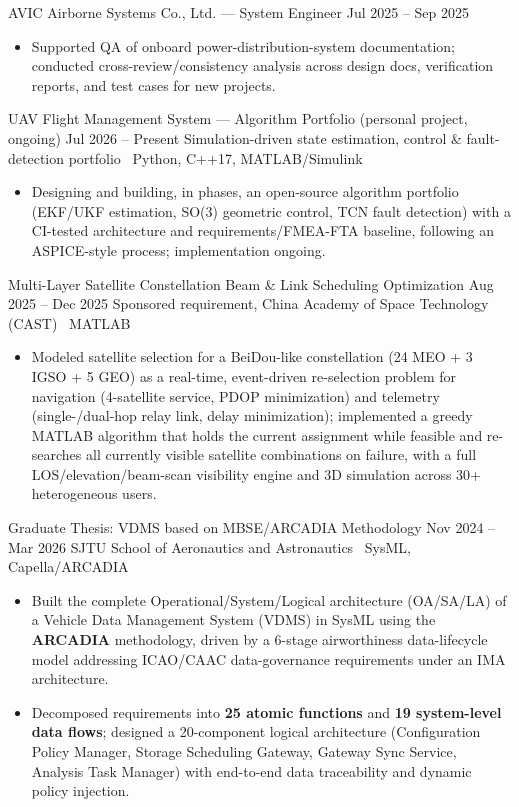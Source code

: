 \documentclass{resume}
\begin{document}
\resumeentry
  {AVIC Airborne Systems Co., Ltd. --- System Engineer}
  {Jul 2025 -- Sep 2025}
  {}
  {}
\begin{itemize}
  \item Supported QA of onboard power-distribution-system documentation; conducted cross-review/consistency analysis across design docs, verification reports, and test cases for new projects.
\end{itemize}


\resumeentry
  {UAV Flight Management System --- Algorithm Portfolio (personal project, ongoing)}
  {Jul 2026 -- Present}
  {Simulation-driven state estimation, control \& fault-detection portfolio \textbar\ Python, C++17, MATLAB/Simulink}
  {}
\begin{itemize}
  \item Designing and building, in phases, an open-source algorithm portfolio (EKF/UKF estimation, SO(3) geometric control, TCN fault detection) with a CI-tested architecture and requirements/FMEA-FTA baseline, following an ASPICE-style process; implementation ongoing.
\end{itemize}

\resumeentry
  {Multi-Layer Satellite Constellation Beam \& Link Scheduling Optimization}
  {Aug 2025 -- Dec 2025}
  {Sponsored requirement, China Academy of Space Technology (CAST) \textbar\ MATLAB}
  {}
\begin{itemize}
  \item Modeled satellite selection for a BeiDou-like constellation (24 MEO + 3 IGSO + 5 GEO) as a real-time, event-driven re-selection problem for navigation (4-satellite service, PDOP minimization) and telemetry (single-/dual-hop relay link, delay minimization); implemented a greedy MATLAB algorithm that holds the current assignment while feasible and re-searches all currently visible satellite combinations on failure, with a full LOS/elevation/beam-scan visibility engine and 3D simulation across 30+ heterogeneous users.
\end{itemize}

\resumeentry
  {Graduate Thesis: VDMS based on MBSE/ARCADIA Methodology}
  {Nov 2024 -- Mar 2026}
  {SJTU School of Aeronautics and Astronautics \textbar\ SysML, Capella/ARCADIA}
  {}
\begin{itemize}
  \item Built the complete Operational/System/Logical architecture (OA/SA/LA) of a Vehicle Data Management System (VDMS) in SysML using the \textbf{ARCADIA} methodology, driven by a 6-stage airworthiness data-lifecycle model addressing ICAO/CAAC data-governance requirements under an IMA architecture.
  \item Decomposed requirements into \textbf{25 atomic functions} and \textbf{19 system-level data flows}; designed a 20-component logical architecture (Configuration Policy Manager, Storage Scheduling Gateway, Gateway Sync Service, Analysis Task Manager) with end-to-end data traceability and dynamic policy injection.
\end{itemize}
\end{document}

